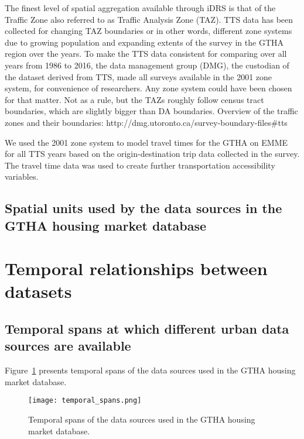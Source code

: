 The finest level of spatial aggregation available through iDRS is that of the Traffic Zone also referred to as Traffic Analysis Zone (TAZ).
TTS data has been collected for changing TAZ boundaries or in other words, different zone systems due to growing population and expanding extents of the survey in the GTHA region over the years.
To make the TTS data consistent for comparing over all years from 1986 to 2016, the data management group (DMG), the custodian of the dataset derived from TTS, made all surveys available in the 2001 zone system, for convenience of researchers.
Any zone system could have been chosen for that matter.
Not as a rule, but the TAZs roughly follow census tract boundaries, which are slightly bigger than DA boundaries.
Overview of the traffic zones and their boundaries: http://dmg.utoronto.ca/survey-boundary-files#tts

We used the 2001 zone system to model travel times for the GTHA on EMME for all TTS years based on the origin-destination trip data collected in the survey.
The travel time data was used to create further transportation accessibility variables.

\subsection{Spatial units used by the data sources in the GTHA housing market database} \label{subsec:spatial_units_used_in_database}


\section{Temporal relationships between datasets} \label{sec:termporal_relationships_between_datasets}

\subsection{Temporal spans at which different urban data sources are available} \label{subsec:temporal_scales}

Figure~\ref{fig:temporal_spans} presents temporal spans of the data sources used in the GTHA housing market database.
\begin{figure}[hbt!]
    \centering
    \texttt{[image: temporal\_spans.png]}
    \caption{Temporal spans of the data sources used in the GTHA housing market database.}
    \label{fig:temporal_spans}
\end{figure}

